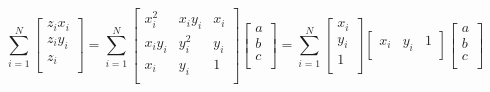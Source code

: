 \documentclass[11pt, fleqn]{article}
\begin{document}
\begin{equation}
    \sum_{i=1}^{N}
    \begin{bmatrix}
        z_i x_i \\
        z_i y_i \\
        z_i \\
    \end{bmatrix}
    =
    \sum_{i=1}^{N}
    \begin{bmatrix}
        x_i^2 & x_i y_i & x_i \\
        x_i y_i & y_i^2 & y_i \\
        x_i & y_i & 1 \\
    \end{bmatrix}
    \begin{bmatrix}
        a \\
        b \\
        c \\
    \end{bmatrix}
    =
    \sum_{i=1}^{N}
    \begin{bmatrix}
        x_i \\
        y_i \\
        1 \\
    \end{bmatrix}
    \begin{bmatrix}
        x_i & y_i & 1 \\
    \end{bmatrix}
    \begin{bmatrix}
        a \\
        b \\
        c \\
    \end{bmatrix}
\end{equation}
\end{document}
